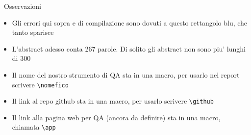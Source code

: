 \documentclass[12pt,a4paper,hidelinks]{article}
\begin{document}
\begin{mydisclaimer}{{\large {}} \,  Osservazioni}
\begin{itemize}
    \item Gli errori qui sopra e di compilazione sono dovuti a questo rettangolo blu, che tanto sparisce
    \item L'abstract adesso conta 267 parole. Di solito gli abstract non sono piu' lunghi di 300
    \item Il nome del nostro strumento di QA sta in una macro, per usarlo nel report scrivere \texttt{\textbackslash nomefico}
    \item Il link al repo github sta in una macro, per usarlo scrivere \texttt{\textbackslash github}
    \item Il link alla pagina web per QA (ancora da definire) sta in una macro, chiamata \texttt{\textbackslash app}
\end{itemize}
\end{mydisclaimer}

\newpage
\end{document}
